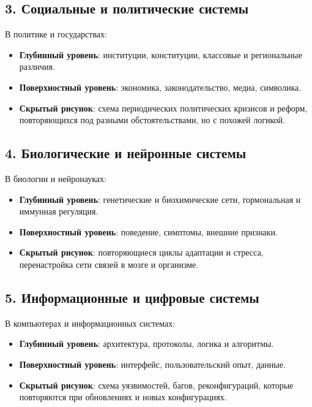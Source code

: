 \documentclass[12pt]{article}
\begin{document}
\subsection{3. Социальные и политические системы}

В политике и государствах:

\begin{itemize}
  \item \textbf{Глубинный уровень}: институции, конституции, классовые и региональные различия.
  \item \textbf{Поверхностный уровень}: экономика, законодательство, медиа, символика.
  \item \textbf{Скрытый рисунок}: схема периодических политических кризисов и реформ, повторяющихся под разными обстоятельствами, но с похожей логикой.
\end{itemize}

\subsection{4. Биологические и нейронные системы}

В биологии и нейронауках:

\begin{itemize}
  \item \textbf{Глубинный уровень}: генетические и биохимические сети, гормональная и иммунная регуляция.
  \item \textbf{Поверхностный уровень}: поведение, симптомы, внешние признаки.
  \item \textbf{Скрытый рисунок}: повторяющиеся циклы адаптации и стресса, перенастройка сети связей в мозге и организме.
\end{itemize}

\subsection{5. Информационные и цифровые системы}

В компьютерах и информационных системах:

\begin{itemize}
  \item \textbf{Глубинный уровень}: архитектура, протоколы, логика и алгоритмы.
  \item \textbf{Поверхностный уровень}: интерфейс, пользовательский опыт, данные.
  \item \textbf{Скрытый рисунок}: схема уязвимостей, багов, реконфигураций, которые повторяются при обновлениях и новых конфигурациях.
\end{itemize}
\end{document}

